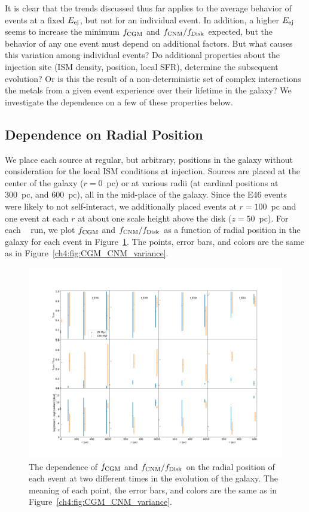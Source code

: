 It is clear that the trends discussed thus far applies to the average behavior of events at a fixed $E_{\rm ej}$, but not for an individual event. In addition, a higher $E_{\rm ej}$ seems to increase the minimum $f_{\rm CGM}$ and $f_{\rm CNM} / f_{\rm Disk}$ expected, but the behavior of any one event must depend on additional factors. But what causes this variation among individual events? Do additional properties about the injection site (ISM density, position, local SFR), determine the subsequent evolution? Or is this the result of a non-deterministic set of complex interactions the metals from a given event experience over their lifetime in the galaxy? We investigate the dependence on a few of these properties below.

\subsection{Dependence on Radial Position}
\label{ch4:sec:radial position}
We place each source at regular, but arbitrary, positions in the galaxy without consideration for the local ISM conditions at injection. Sources are placed at the center of the galaxy ($r = 0$~pc) or at various radii (at cardinal positions at 300~pc, and 600~pc), all in the mid-place of the galaxy. Since the E46 events were likely to not self-interact, we additionally placed events at $r = 100$~pc and one event at each $r$ at about one scale height above the disk ($z = 50$~pc). For each \runonenu~ run, we plot $f_{\rm CGM}$ and $f_{\rm CNM} / f_{\rm Disk}$ as a function of radial position in the galaxy for each event in Figure~\ref{ch4:fig:radial position}. The points, error bars, and colors are the same as in Figure~\ref{ch4:fig:CGM_CNM_variance}.

 \begin{figure}
   \centering
   \includegraphics[angle=90,width=0.9\linewidth]{figures/ch4/II_radial_dependence}
   \caption{The dependence of $f_{\rm CGM}$ and $f_{\rm CNM} / f_{\rm Disk}$ on the radial position of each event at two different times in the evolution of the galaxy. The meaning of each point, the error bars, and colors are the same as in Figure~\ref{ch4:fig:CGM_CNM_variance}.}
   \label{ch4:fig:radial position}
 \end{figure}

